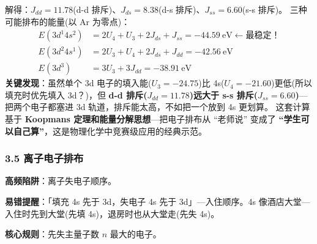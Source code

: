 解得：\(J_{dd} = 11.78\)(d-d 排斥)、\(J_{ds} = 8.38\)(d-s 排斥)、\(J_{ss} = 6.60\)(s-s 排斥)。
三种可能排布的能量(以 Ar 为零点)：
\[\begin{aligned}
E(3d^1 4s^2) &= 2U_4 + U_3 + 2J_{ds} + J_{ss} = -44.59\ \mathrm{eV} \leftarrow \text{最稳定！}\\
E(3d^2 4s^1) &= 2U_3 + U_4 + 2J_{ds} + J_{dd} = -42.56\ \mathrm{eV}\\
E(3d^3)      &= 3U_3 + 3J_{dd} = -38.91\ \mathrm{eV}
\end{aligned}\]
\textbf{关键发现}：虽然单个 3d 电子的填入能(\(U_3 = -24.75\))比 4s(\(U_4 = -21.60\))更低(所以填充时优先填入 3d？)，但 \textbf{d-d 排斥(\(J_{dd} = 11.78\))远大于 s-s 排斥(\(J_{ss} = 6.60\))}---把两个电子都塞进 3d 轨道，排斥能太高，不如把一个放到 4s 更划算。
这套计算基于 \textbf{Koopmans 定理和能量分解思想}---把电子排布从 ``老师说'' 变成了 \textbf{``学生可以自己算''}，这是物理化学中竞赛级应用的经典示范。

\subsubsection{3.5 离子电子排布}\label{ux79bbux5b50ux7535ux5b50ux6392ux5e03}

\textbf{高频陷阱}：离子失电子顺序。

\textbf{易错提醒}：「填充 4s 先于 3d，失电子 4s 先于 3d」---入住顺序。4s 像酒店大堂---入住时先到大堂(先填 4s)，退房时也从大堂走(先失 4s)。

\textbf{核心规则}：先失主量子数 \(n\) 最大的电子。

